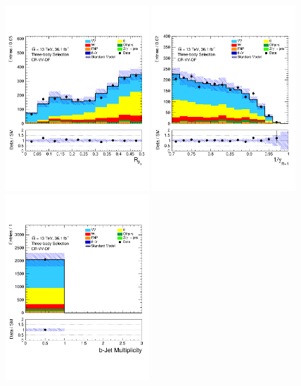 \begin{figure}[!htb]
    \begin{center}
        \includegraphics[width=0.48\textwidth]{figures/search_stop2l/bkg_est/crvdf/crv_RPT}
        \includegraphics[width=0.48\textwidth]{figures/search_stop2l/bkg_est/crvdf/crv_gamInvRp1}
        \includegraphics[width=0.48\textwidth]{figures/search_stop2l/bkg_est/crvdf/crv_nBJets}

\end{center}
\end{figure}
